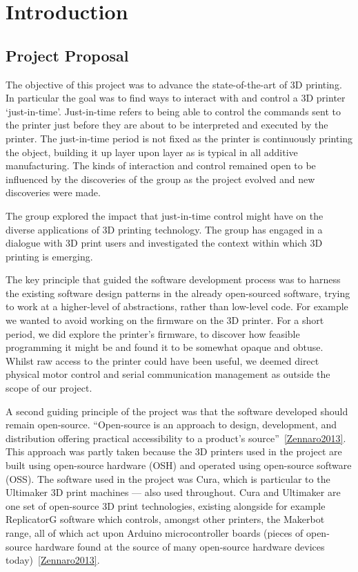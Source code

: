 \documentclass[11pt]{report} %
\begin{document}
\tableofcontents


\chapter{Introduction}
\section{Project Proposal}
The objective of this project was to advance the state-of-the-art of 3D printing. In particular the goal was to find ways to interact with and control a 3D printer `just-in-time'. Just-in-time refers to being able to control the commands sent to the printer just before they are about to be interpreted and executed by the printer. The just-in-time period is not fixed as the printer is continuously printing the object, building it up layer upon layer as is typical in all additive manufacturing. The kinds of interaction and control remained open to be influenced by the discoveries of the group as the project evolved and new discoveries were made.

The group explored the impact that just-in-time control might have on the diverse applications of 3D printing technology. The group has engaged in a dialogue with 3D print users and investigated the context within which 3D printing is emerging. 

The key principle that guided the software development process was to harness the existing software design patterns in the already open-sourced software, trying to work at a higher-level of abstractions, rather than low-level code. For example we wanted to avoid working on the firmware on the 3D printer. For a short period, we did explore the printer's firmware, to discover how feasible programming it might be and found it to be somewhat opaque and obtuse. Whilst raw access to the printer could have been useful, we deemed direct physical motor control and serial communication management as outside the scope of our project.

A second guiding principle of the project was that the software developed should remain open-source. ``Open-source is an approach to design, development, and distribution offering practical accessibility to a product's source''~\ref{Zennaro2013}. This approach was partly taken because the 3D printers used in the project are built using open-source hardware (OSH) and operated using open-source software (OSS). The software used in the project was Cura, which is particular to the Ultimaker 3D print machines --- also used throughout. Cura and Ultimaker are one set of open-source 3D print technologies, existing alongside for example ReplicatorG software which controls, amongst other printers, the Makerbot range, all of which act upon Arduino microcontroller boards (pieces of open-source hardware found at the source of many open-source hardware devices today)~\ref{Zennaro2013}.
\end{document}
